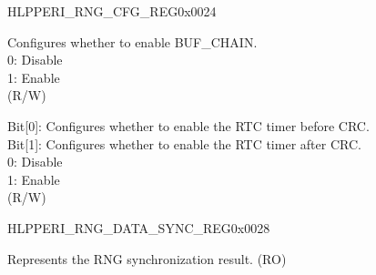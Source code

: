 \begin{register}{H}{LPPERI\_RNG\_CFG\_REG}{0x0024}\label{regdesc:LPPERIRNGCFGREG}
%
%
%
%
%
\regnewline%
\begin{regdesc}\begin{reglist}
\label{fielddesc:LPPERIRNGSAMPLEENABLE}\item [LPPERI\_RNG\_SAMPLE\_ENABLE] Configures whether to enable BUF\_CHAIN.\\0: Disable\\ 1: Enable\\  (R/W)
\label{fielddesc:LPPERIRTCTIMEREN}\item [LPPERI\_RTC\_TIMER\_EN]
Bit[0]: Configures whether to enable the RTC timer before CRC.\\
Bit[1]: Configures whether to enable the RTC timer after CRC.\\
0: Disable\\ 1: Enable\\ (R/W)
\end{reglist}\end{regdesc}
\end{register}


\begin{register}{H}{LPPERI\_RNG\_DATA\_SYNC\_REG}{0x0028}\label{regdesc:LPPERIRNGSYNCDATAREG}
%
\regnewline%
\begin{regdesc}\begin{reglist}
\label{fielddesc:LPPERIRNDSYNCDATA}\item [LPPERI\_RND\_SYNC\_DATA] Represents the RNG synchronization result. (RO)
\end{reglist}\end{regdesc}
\end{register}
